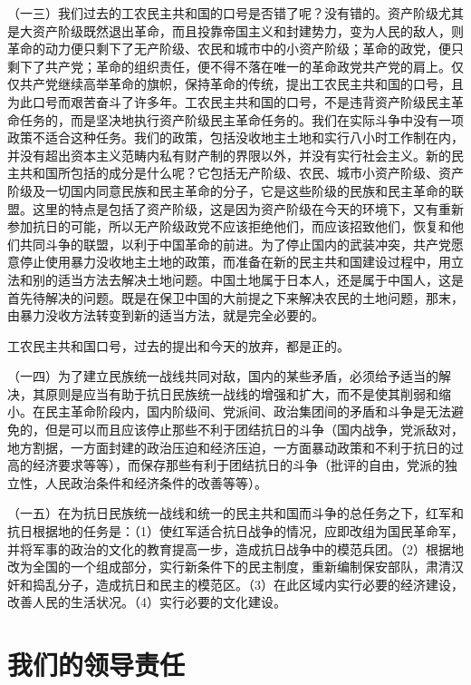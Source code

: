 （一三）我们过去的工农民主共和国的口号是否错了呢？没有错的。资产阶级尤其是大资产阶级既然退出革命，而且投靠帝国主义和封建势力，变为人民的敌人，则革命的动力便只剩下了无产阶级、农民和城市中的小资产阶级；革命的政党，便只剩下了共产党；革命的组织责任，便不得不落在唯一的革命政党共产党的肩上。仅仅共产党继续高举革命的旗帜，保持革命的传统，提出工农民主共和国的口号，且为此口号而艰苦奋斗了许多年。工农民主共和国的口号，不是违背资产阶级民主革命任务的，而是坚决地执行资产阶级民主革命任务的。我们在实际斗争中没有一项政策不适合这种任务。我们的政策，包括没收地主土地和实行八小时工作制在内，并没有超出资本主义范畴内私有财产制的界限以外，并没有实行社会主义。新的民主共和国所包括的成分是什么呢？它包括无产阶级、农民、城市小资产阶级、资产阶级及一切国内同意民族和民主革命的分子，它是这些阶级的民族和民主革命的联盟。这里的特点是包括了资产阶级，这是因为资产阶级在今天的环境下，又有重新参加抗日的可能，所以无产阶级政党不应该拒绝他们，而应该招致他们，恢复和他们共同斗争的联盟，以利于中国革命的前进。为了停止国内的武装冲突，共产党愿意停止使用暴力没收地主土地的政策，而准备在新的民主共和国建设过程中，用立法和别的适当方法去解决土地问题。中国土地属于日本人，还是属于中国人，这是首先待解决的问题。既是在保卫中国的大前提之下来解决农民的土地问题，那末，由暴力没收方法转变到新的适当方法，就是完全必要的。

工农民主共和国口号，过去的提出和今天的放弃，都是正的。

（一四）为了建立民族统一战线共同对敌，国内的某些矛盾，必须给予适当的解决，其原则是应当有助于抗日民族统一战线的增强和扩大，而不是使其削弱和缩小。在民主革命阶段内，国内阶级间、党派间、政治集团间的矛盾和斗争是无法避免的，但是可以而且应该停止那些不利于团结抗日的斗争（国内战争，党派敌对，地方割据，一方面封建的政治压迫和经济压迫，一方面暴动政策和不利于抗日的过高的经济要求等等），而保存那些有利于团结抗日的斗争（批评的自由，党派的独立性，人民政治条件和经济条件的改善等等）。

（一五）在为抗日民族统一战线和统一的民主共和国而斗争的总任务之下，红军和抗日根据地的任务是：（1）使红军适合抗日战争的情况，应即改组为国民革命军，并将军事的政治的文化的教育提高一步，造成抗日战争中的模范兵团。（2）根据地改为全国的一个组成部分，实行新条件下的民主制度，重新编制保安部队，肃清汉奸和捣乱分子，造成抗日和民主的模范区。（3）在此区域内实行必要的经济建设，改善人民的生活状况。（4）实行必要的文化建设。

\section{我们的领导责任}

